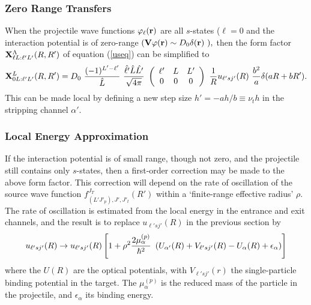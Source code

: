\documentclass[11pt,a4paper]{article}
\newcommand{\vecr}{{\bf r}}
\begin{document}
\subsubsection{Zero Range Transfers}

When the projectile wave functions
$ \varphi_\ell ( \vecr ) $
are all $s$-states ($\ell=0$ and
the interaction potential is of zero-range
$ ({\bf V} \varphi (\vecr) \sim D_0 \delta ( \vecr )~) , $
then the form factor
$ {\bf X}^\Lambda_{\ell L: \ell' L'} (R,R' ) $
of equation (\ref{useq}) can be simplified to
\begin{eqnarray}
{\bf X}^L_{0L: \ell' L'} (R,R') = D_0  ~
          {(-1)^{L' - \ell'} \over \hat L} ~
          {\hat{\ell'} \hat L \hat {L'}\over \sqrt{4 \pi}} ~
          \left ( \begin {array}{ccc}\ell'&L &L'\\0&0&0\end{array} \right ) ~
          {1 \over R} u_{\ell' sj'} (R ) ~
          {b^2 \over a} \delta (aR+bR') .
\end{eqnarray}
This can be made local by defining a new step size
$h' = -ah/b \equiv \nu_t h$
in the stripping channel $\alpha'$.
\subsubsection{Local Energy Approximation}

If the interaction potential is of small range, though not zero,
and the projectile still contains only $s$-states,
then a first-order correction may be made to the above form factor.
This correction will depend on the rate of oscillation of the source wave
function
$   f^{J_T} _{ (L' J'_ p),J' ,J'_ t} (R' ) $
within a `finite-range effective radius' $\rho$.
The rate of oscillation is estimated from the local energy
in the entrance and exit channels,
and the result \cite{buttle64}
is to replace $u_{\ell' sj'} (R) $
in the previous section by
\begin{eqnarray} \label{lea}
u_{\ell' sj'} (R) \rightarrow
u_{\ell' sj'} (R)
    \left [ 1 + \rho^2 {2 \mu _\alpha^{(p)}\over \hbar^2} ~
    \left ( U_{\alpha'} ( R) + V_{\ell' sj'} (R)
          -U _\alpha (R) + \epsilon _\alpha \right ) \right ]
\end{eqnarray}
where the $U(R)$ are the optical potentials, with
$V_{\ell' sj'} (r)$ the single-particle binding potential in the target.
The $ \mu _\alpha^{(p)}$ is the reduced mass of the particle in the projectile,
and $ \epsilon _\alpha $ its binding energy.
\end{document}
